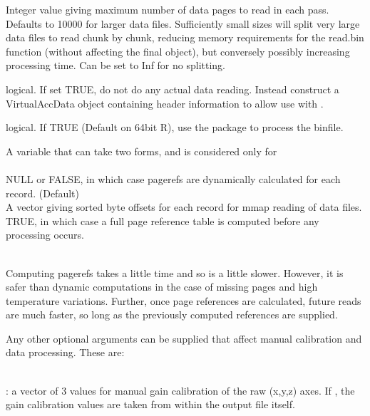 \documentclass[a4paper]{book}
\begin{document}
\begin{Arguments}
\begin{ldescription}
\item[\code{blocksize}] 
Integer value giving maximum number of data pages to read in each pass. Defaults to 10000 for larger data files. Sufficiently small sizes will split very large data files to read chunk by chunk, reducing memory requirements for the read.bin function (without affecting the final object), but conversely possibly increasing processing time. Can be set to Inf for no splitting.


\item[\code{virtual}] 
logical. If set TRUE, do not do any actual data reading. Instead construct a VirtualAccData object containing header information to allow use with .


\item[\code{mmap.load}] 
logical. If TRUE (Default on 64bit R), use the  package to process the binfile.


\item[\code{pagerefs}] 
A variable that can take two forms, and is considered only for \\{}\\{}
NULL or FALSE, in which case pagerefs are dynamically calculated for each record. (Default) \\{}
A vector giving sorted byte offsets for each record for mmap reading of data files.\\{}
TRUE, in which case a full page reference table is computed before any processing occurs.\\{}\\{}

Computing pagerefs takes a little time and so is a little slower. However, it is safer than dynamic computations in the case of missing pages and high temperature variations. Further, once page references are calculated, future reads are much faster, so long as the previously computed references are supplied.



\item[\code{...}] Any other optional arguments can be supplied that affect manual calibration and data processing.  These are: \\{}\\{}

: a vector of 3 values for manual gain calibration of the raw (x,y,z) axes.  If , the gain calibration values are taken from within the output file itself.\\{}


\end{ldescription}
\end{Arguments}
\end{document}
